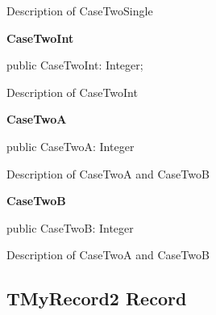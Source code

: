 \documentclass{report}
\newif\ifpdf
\begin{document}
\begin{list}{}
\begin{flushleft}
\ifpdf
\end{flushleft}
\fi


\par Description of CaseTwoSingle\label{ok_record_with_case.TMyRecord1-CaseTwoInt}
\item[\textbf{CaseTwoInt}\hfill]
\ifpdf
\begin{flushleft}
\fi
\begin{ttfamily}
public CaseTwoInt: Integer;\end{ttfamily}

\ifpdf
\end{flushleft}
\fi


\par Description of CaseTwoInt\label{ok_record_with_case.TMyRecord1-CaseTwoA}
\item[\textbf{CaseTwoA}\hfill]
\ifpdf
\begin{flushleft}
\fi
\begin{ttfamily}
public CaseTwoA: Integer\end{ttfamily}

\ifpdf
\end{flushleft}
\fi


\par Description of CaseTwoA and CaseTwoB\label{ok_record_with_case.TMyRecord1-CaseTwoB}
\item[\textbf{CaseTwoB}\hfill]
\ifpdf
\begin{flushleft}
\fi
\begin{ttfamily}
public CaseTwoB: Integer\end{ttfamily}

\ifpdf
\end{flushleft}
\fi


\par Description of CaseTwoA and CaseTwoB\end{list}
\ifpdf
\subsection*{\large{\textbf{TMyRecord2 Record}}\normalsize\hspace{1ex}\hrulefill}
\else
\subsection*{TMyRecord2 Record}
\fi
\label{ok_record_with_case.TMyRecord2}
\end{document}

